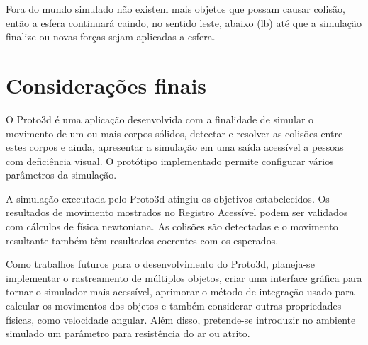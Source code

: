 \documentclass[12pt]{article}
\begin{document}
Fora do mundo simulado não existem mais objetos que possam causar colisão, então a esfera continuará caindo, no sentido leste, abaixo (lb) até que a simulação finalize ou novas forças sejam aplicadas a esfera.



%
%


\section{Considerações finais}
O Proto3d é uma aplicação desenvolvida com a finalidade de simular o movimento de um ou mais corpos sólidos, detectar e resolver as colisões entre estes corpos e ainda, apresentar a simulação em uma saída acessível a pessoas com deficiência visual. O protótipo implementado permite configurar vários parâmetros da simulação. 

A simulação executada pelo Proto3d atingiu os objetivos estabelecidos. Os resultados de movimento mostrados no Registro Acessível podem ser validados com cálculos de física newtoniana. As colisões são detectadas e o movimento resultante também têm resultados coerentes com os esperados. 

Como trabalhos futuros para o desenvolvimento do Proto3d, planeja-se implementar o rastreamento de múltiplos objetos, criar uma interface gráfica para tornar o simulador mais acessível, aprimorar o método de integração usado para calcular os movimentos dos objetos e também considerar outras propriedades físicas, como velocidade angular. Além disso, pretende-se introduzir no ambiente simulado um parâmetro para resistência do ar ou atrito.



\end{document}
